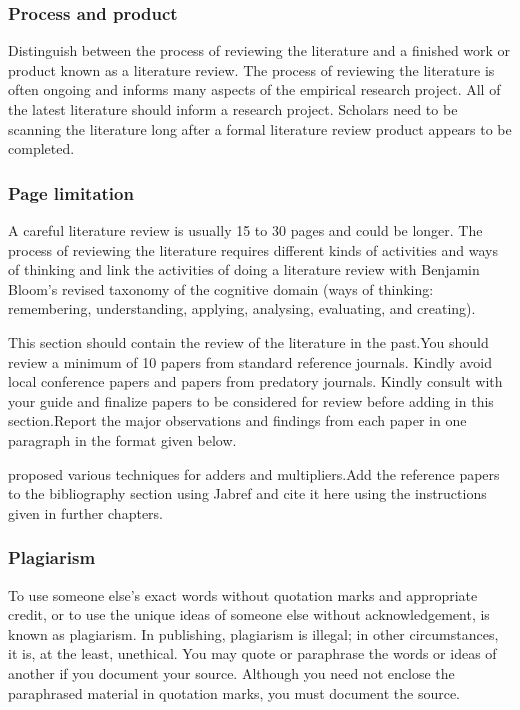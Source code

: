 \subsubsection[Process and product]{\textbf{Process and product}}

Distinguish between the process of reviewing the literature and a finished work or product known as a literature review. The process of reviewing the literature is often ongoing and informs many aspects of the empirical research project. All of the latest literature should inform a research project. Scholars need to be scanning the literature long after a formal literature review product appears to be completed.

\subsubsection{\textbf{Page limitation}}

A careful literature review is usually 15 to 30 pages and could be longer. The process of reviewing the literature requires different kinds of activities and ways of thinking and link the activities of doing a literature review with Benjamin Bloom’s revised taxonomy of the cognitive domain (ways of thinking: remembering, understanding, applying, analysing, evaluating, and creating).

This section should contain the review of the literature in the past.You should review a minimum of 10 papers from standard reference journals. Kindly avoid local conference papers and papers from predatory journals. Kindly consult with your guide and finalize papers to be considered for review before adding in this section.Report the major observations and findings from each paper in one paragraph in the format given below.

 proposed various techniques for adders and multipliers.Add the reference papers to the bibliography section using Jabref and cite it here using the instructions given in further chapters.


\subsubsection{\textbf{Plagiarism}}

To use someone else's exact words without quotation marks and appropriate credit, or to use the unique ideas of someone else without acknowledgement, is known as plagiarism. In publishing, plagiarism is illegal; in other circumstances, it is, at the least, unethical. You may quote or paraphrase the words or ideas of another if you document your source. Although you need not enclose the paraphrased material in quotation marks, you must document the source. 

